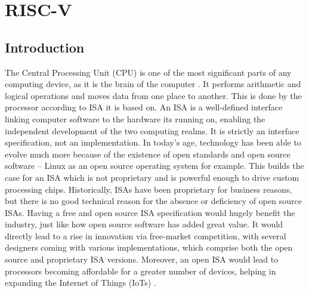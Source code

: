\chapter{RISC-V}
\label{ch6_riscv}

\section{Introduction}
 \label{sect6_1}

The Central Processing Unit (CPU) is one of the most significant parts of any computing device, as it is the brain of the computer \cite{riscv_xda}. It performs arithmetic and logical operations and moves data from one place to another. This is done by the processor according to ISA it is based on. An ISA is a well-defined interface linking computer software to the hardware its running on, enabling the independent development of the two computing realms. It is strictly an interface specification, not an implementation. \newline\newline
In today's age, technology has been able to evolve much more because of the existence of open standards and open source software – Linux as an open source operating system for example. This builds the case for an ISA which is not proprietary and is powerful enough to drive custom processing chips. \newline\newline
Historically, ISAs have been proprietary for business reasons, but there is no good technical reason for the absence or deficiency of open source ISAs. Having a free and open source ISA specification would hugely benefit the industry, just like how open source software has added great value. It would directly lead to a rise in innovation via free-market competition, with several designers coming with various implementations, which comprise both the open source and proprietary ISA versions. Moreover, an open ISA would lead to processors becoming affordable for a greater number of devices, helping in expanding the Internet of Things (IoTs) \cite{riscv_isa_free}.

